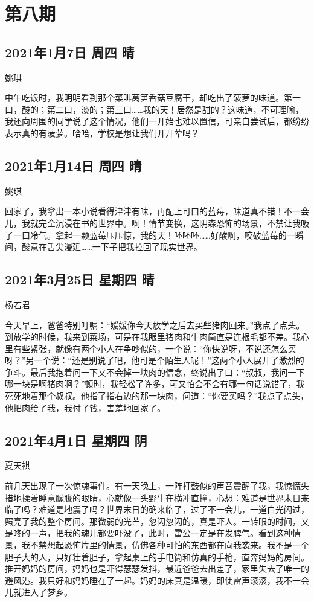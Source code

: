 \chapter{第八期}

\section{2021年1月7日 周四 晴}

姚琪

中午吃饭时，我明明看到那个菜叫莴笋香菇豆腐干，却吃出了菠萝的味道。第一口，酸的；第二口，淡的；第三口\ldots\ldots 我的天！居然是甜的？这味道，不可理喻，我还向周围的同学说了这个情况，他们一开始也难以置信，可亲自尝试后，都纷纷表示真的有菠萝。哈哈，学校是想让我们开开荤吗？

\section{2021年1月14日 周四 晴}

姚琪

回家了，我拿出一本小说看得津津有味，再配上可口的蓝莓，味道真不错！不一会儿，我就完全沉浸在书的世界中。啊！情节变换，这阴森恐怖的场景，不禁让我吸了一口冷气。拿起一颗蓝莓压压惊，我的天！呸呸呸\ldots\ldots 好酸啊，咬破蓝莓的一瞬间，酸意在舌尖漫延\ldots\ldots 一下子把我拉回了现实世界。

\section{2021年3月25日 星期四 晴}

杨若君

今天早上，爸爸特别叮嘱：``媛媛你今天放学之后去买些猪肉回来。''我点了点头。到放学的时候，我来到菜场，可是在我眼里猪肉和牛肉简直是连根毛都不差。我心里有些紧张，就像有两个小人在争吵似的，一个说：``你快说呀，不说还怎么买呀？''另一个说：``还是别说了吧，他可是个陌生人呢！''这两个小人展开了激烈的争斗。最后我抱着问一下又不会掉一块肉的信念，终说出了口：``叔叔，我问一下哪一块是啊猪肉啊？''顿时，我轻松了许多，可又怕会不会有哪一句话说错了，我死死地着那个叔叔。他指了指右边的那一块肉，问道：``你要买吗？''我点了点头，他把肉给了我，我付了钱，害羞地回家了。

\section{2021年4月1日 星期四 阴}

夏天褀

前几天出现了一次惊魂事件。有一天晚上，一阵打鼓似的声音震醒了我，我惊慌失措地揉着睡意朦胧的眼睛，心就像一头野牛在横冲直撞，心想：难道是世界末日来临了吗？难道是地震了吗？世界末日的确来临了，过了不一会儿，一道白光闪过，照亮了我的整个房间。那微弱的光芒，忽闪忽闪的，真是吓人。一转眼的时间，又是咚的一声，把我的魂儿都要吓没了，此时，雷公一定是在发脾气。看到这种情景，我不禁想起恐怖片里的情景，仿佛各种可怕的东西都在向我袭来。我不是一个胆子大的人，只好壮着胆子，拿起桌上的手电筒和仿真的手枪，直奔妈妈的房间。推开妈妈的房间，妈妈也是吓得瑟瑟发抖，最近爸爸去出差了，家里失去了唯一的避风港。我只好和妈妈睡在了一起。妈妈的床真是温暖，即使雷声滚滚，我不一会儿就进入了梦乡。

